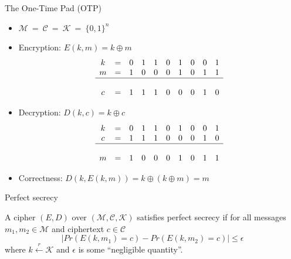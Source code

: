 \documentclass[aspectratio=169, lualatex, 10pt,dvipsnames,svgnames]{beamer} %
\newcommand{\Ccal}{\mathcal{C}}
\newcommand{\Kcal}{\mathcal{K}}
\newcommand{\Mcal}{\mathcal{M}}
\begin{document}
\begin{frame}{The One-Time Pad (OTP)}
  \pause
  \vspace{-0.5cm}
  \begin{itemize}

  \item $\Mcal\ =\ \Ccal\ =\ \Kcal\ =\ \{0, 1\}^n$
    \medskip{}
    \pause

  \item Encryption: $E(k, m) = k \oplus m$
    \pause
    \color{vert}
    \[
    \begin{array}[t]{ccccccccccccccccccccc}
      k & = & 0 & 1 & 1 & 0 & 1 & 0 & 0 & 1 \\
      m & = & 1 & 0 & 0 & 0 & 1 & 0 & 1 & 1 \\
      \hline \\
      c & = & 1 & 1 & 1 & 0 & 0 & 0 & 1 & 0
    \end{array}
    \]
    \color{black}
    \pause

  \item Decryption: $D(k, c) = k \oplus c$
    \pause
    \color{vert}
    \[
    \begin{array}[t]{ccccccccccccccccccccc}
      k & = & 0 & 1 & 1 & 0 & 1 & 0 & 0 & 1 \\
      c & = & 1 & 1 & 1 & 0 & 0 & 0 & 1 & 0 \\
      \hline \\
      m & = & 1 & 0 & 0 & 0 & 1 & 0 & 1 & 1
    \end{array}
    \]
    \color{black}
    \pause

  \item Correctness: $D(k, E(k, m)) = k \oplus (k\oplus m) = m$
  \end{itemize}
\end{frame}

\begin{frame}{Perfect secrecy}
  

  \begin{definition}
A cipher $(E, D)$ over $(\Mcal, \Ccal, \Kcal)$ satisfies perfect secrecy 
if for all messages $m_1, m_2\in\Mcal$ and ciphertext $c\in\Ccal$
    \[
    \left| Pr(E(k, m_1) = c) - Pr(E(k, m_2) = c)
    \right| \le \epsilon
    \]
    where $k \xleftarrow[]{r} \Kcal$ and $\epsilon$ is some ``negligible quantity''.
  \end{definition}

\end{frame}
\end{document}
